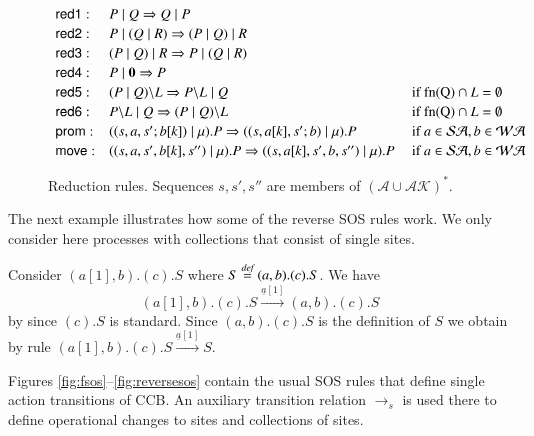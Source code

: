 {\begin{figure}[t] 
\[
\begin{array}{lll}
\textsf{red1}: & P\mid Q \Rightarrow Q\mid P& 
\\[2pt]
\textsf{red2}: & P\mid (Q\mid R) \Rightarrow (P\mid Q)\mid R &
\\[2pt]
\textsf{red3}: & (P\mid Q)\mid R \Rightarrow P\mid (Q\mid R) & 
\\[2pt]
\textsf{red4}: & P\mid \mathbf{0} \Rightarrow P & 
\\[2pt]
\textsf{red5}: & (P\; \vert \; Q)\backslash L \Rightarrow P\backslash L \; \vert \; Q & \mbox{ if fn(Q)} \cap L = \emptyset
\\[2pt]
\textsf{red6}: & P\backslash L \; \vert \; Q \Rightarrow (P\; \vert \; Q)\backslash L & \mbox{ if fn(Q)} \cap L = \emptyset
\\[2pt]
\textsf{prom}: & ( (s,a,s';b[k])\mid \mu).P \Rightarrow ((s,a[k],s';b)\mid \mu).P & \mbox{ if } a \in \mathcal{SA}, b \in \mathcal{WA} 
\\[2pt]
\textsf{move}: & ((s,a,s',b[k],s'')\mid \mu).P \Rightarrow ((s,a[k],s',b,s'')\mid \mu).P & \mbox{ if } a \in \mathcal{SA}, b \in \mathcal{WA}
\end{array}
\] 
\caption{Reduction rules. Sequences $s, s', s''$ are members of $(\mathcal{A} \cup \mathcal{AK})^{*}$.} 
\label{fig:reduction}
\end{figure}

The next example illustrates how some of the reverse SOS rules work. We only consider here processes with collections that consist of single sites. 
\begin{example}
{\rm 
Consider $(a[1],b).(c).S$ where $S\stackrel{\emph{def}}{=} (a,b).(c).S$. We have 
$$(a[1],b).(c).S \xrightarrow{\underline{a}[1]} (a,b).(c).S$$ by  since $(c).S$ is standard.
Since $(a,b).(c).S$ is the definition of $S$ we obtain by rule  $(a[1],b).(c).S \xrightarrow{\underline{a}[1]} S$.
}
\end{example}

Figures  \ref{fig:fsos}--\ref{fig:reversesos} contain the usual SOS rules that define single action transitions of CCB. An auxiliary transition relation $\xrightarrow{}_s$ is used there to define operational changes to sites and collections of sites.  


}
